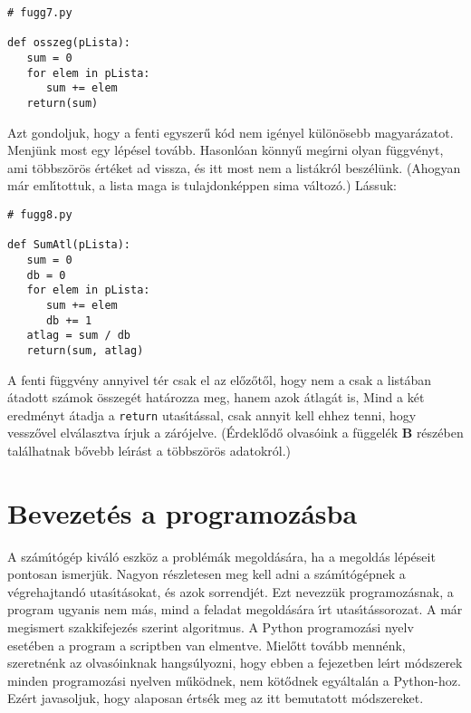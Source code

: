 \documentclass[12pt]{article}
\newcounter{feladat}
\newcounter{megold}
\begin{document}
\begin{Verbatim}[fontsize=\small]
# fugg7.py

def osszeg(pLista):
   sum = 0
   for elem in pLista:
      sum += elem
   return(sum)
\end{Verbatim}

Azt gondoljuk, hogy a fenti egyszer\H{u} k\'od nem ig\'enyel k\"ul\"on\"osebb magyar\'azatot. Menj\"unk most 
egy l\'ep\'esel tov\'abb. Hasonl\'oan k\"onny\H{u} meg\'{\i}rni olyan f\"uggv\'enyt, ami t\"obbsz\"or\"os 
\'ert\'eket ad vissza, \'es itt most nem a list\'akr\'ol besz\'el\"unk. (Ahogyan m\'ar eml\'{\i}tottuk, a lista 
maga is tulajdonk\'eppen sima v\'altoz\'o.) L\'assuk:

\begin{Verbatim}[fontsize=\small]
# fugg8.py

def SumAtl(pLista):
   sum = 0
   db = 0
   for elem in pLista:
      sum += elem
      db += 1
   atlag = sum / db
   return(sum, atlag)
\end{Verbatim}

A fenti f\"uggv\'eny annyivel t\'er csak el az el\H{o}z\H{o}t\H{o}l, hogy nem a csak a list\'aban \'atadott 
sz\'amok \"osszeg\'et hat\'arozza meg, hanem azok \'atlag\'at is, Mind a k\'et eredm\'enyt \'atadja a {\tt return}
utas\'{\i}t\'assal, csak annyit kell ehhez tenni, hogy vessz\H{o}vel elv\'alasztva \'irjuk a z\'ar\'ojelve. 
(\'Erdekl\H{o}d\H{o} olvas\'oink a f\"uggel\'ek {\bf B} r\'esz\'eben tal\'alhatnak b\H{o}vebb le\'{\i}r\'ast a 
t\"obbsz\"or\"os adatokr\'ol.)

\section{Bevezet\'es a programoz\'asba}

A sz\'am\'{\i}t\'og\'ep kiv\'al\'o eszk\"oz a probl\'em\'ak megold\'as\'ara, ha a megold\'as l\'ep\'eseit 
pontosan ismerj\"uk. Nagyon r\'eszletesen meg kell adni a sz\'am\'{\i}t\'og\'epnek a v\'eg\-re\-haj\-tan\-d\'o 
utas\'{\i}t\'asokat, \'es azok sorrendj\'et. Ezt nevezz\"uk programoz\'asnak, a program ugyanis nem m\'as, 
mind a feladat megold\'as\'ara \'{\i}rt utas\'{\i}t\'assorozat. A m\'ar megismert szakkifejez\'es szerint 
algoritmus. A Python programoz\'asi nyelv eset\'eben a program a scriptben van elmentve. Miel\H{o}tt tov\'abb 
menn\'enk, szeretn\'enk az olvas\'oinknak hangs\'ulyozni, hogy ebben a fejezetben le\'{\i}rt m\'odszerek minden 
programoz\'asi nyelven m\H{u}k\"odnek, nem k\"ot\H{o}dnek egy\'altal\'an a Python-hoz. Ez\'ert javasoljuk, hogy 
alaposan \'erts\'ek meg az itt bemutatott m\'odszereket.
\end{document}
